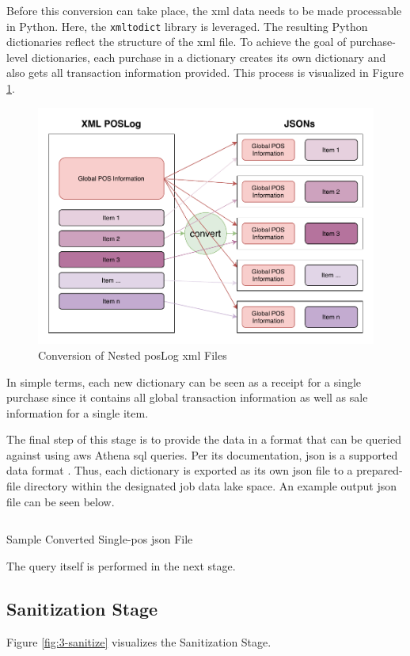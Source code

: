 Before this conversion can take place, the \ac{xml} data needs to be made processable in Python. Here, the \texttt{xmltodict} library is leveraged. The resulting Python dictionaries reflect the structure of the \ac{xml} file. To achieve the goal of purchase-level dictionaries, each purchase in a dictionary creates its own dictionary and also gets all transaction information provided. This process is visualized in Figure \ref{fig:3-convert-process}. %

\begin{figure}[h!]
	\centering
	\includegraphics[width=0.67\linewidth]{main-matter/img/3-convert-process.pdf}
	\caption{Conversion of Nested \acs{pos}Log \acs{xml} Files}
	\label{fig:3-convert-process}
\end{figure}

In simple terms, each new dictionary can be seen as a receipt for a single purchase since it contains all global transaction information as well as sale information for a single item.

The final step of this stage is to provide the data in a format that can be queried against using \ac{aws} Athena \ac{sql} queries. Per its documentation, \ac{json} is a supported data format \cite{athena}. Thus, each dictionary is exported as its own \ac{json} file to a prepared-file directory within the designated job data lake space. An example output \ac{json} file can be seen below.

\begin{longlisting}
	\inputminted{json}{main-matter/src/3-json.json}
	\caption{Sample Converted Single-\acs{pos} \acs{json} File}
	\label{src:3-json}
\end{longlisting}

The query itself is performed in the next stage.

\subsection{Sanitization Stage}
Figure \ref{fig:3-sanitize} visualizes the Sanitization Stage.

